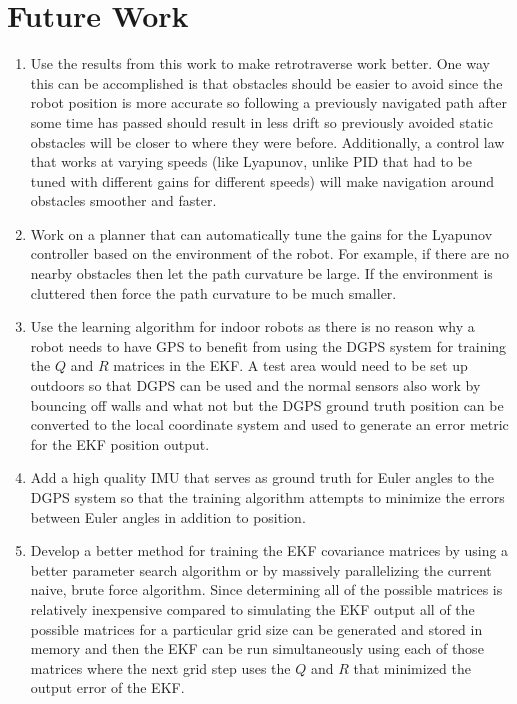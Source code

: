 \chapter{Future Work}
\label{ch:futurework}

\begin{enumerate}
\item Use the results from this work to make retrotraverse work better. One way this can be accomplished is that obstacles should be easier to avoid since the robot position is more accurate so following a previously navigated path after some time has passed should result in less drift so previously avoided static obstacles will be closer to where they were before. Additionally, a control law that works at varying speeds (like Lyapunov, unlike PID that had to be tuned with different gains for different speeds) will make navigation around obstacles smoother and faster.
\item Work on a planner that can automatically tune the gains for the Lyapunov controller based on the environment of the robot. For example, if there are no nearby obstacles then let the path curvature be large. If the environment is cluttered then force the path curvature to be much smaller.
\item Use the learning algorithm for indoor robots as there is no reason why a robot needs to have GPS to benefit from using the DGPS system for training the $Q$ and $R$ matrices in the EKF. A test area would need to be set up outdoors so that DGPS can be used and the normal sensors also work by bouncing off walls and what not but the DGPS ground truth position can be converted to the local coordinate system and used to generate an error metric for the EKF position output.
\item Add a high quality IMU that serves as ground truth for Euler angles to the DGPS system so that the training algorithm attempts to minimize the errors between Euler angles in addition to position.
\item Develop a better method for training the EKF covariance matrices by using a better parameter search algorithm or by massively parallelizing the current naive, brute force algorithm. Since determining all of the possible matrices is relatively inexpensive compared to simulating the EKF output all of the possible matrices for a particular grid size can be generated and stored in memory and then the EKF can be run simultaneously using each of those matrices where the next grid step uses the $Q$ and $R$ that minimized the output error of the EKF.

\end{enumerate}
